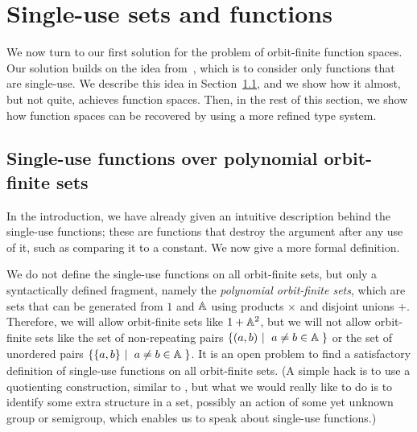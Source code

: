 \section{Single-use sets and functions}
\label{sec:single-use-sets}
We now turn to our first solution for the problem of orbit-finite function spaces.  Our solution builds on the idea from~\cite[Section 2.2]{stefanski-phd}, which is to consider only functions that are single-use. We describe this idea in Section~\ref{sec:single-use-functions-over-polynomial-orbit-finite-sets}, and we show how it almost, but not quite, achieves function spaces. Then, in the rest of this section, we show how function spaces can be recovered by using a more refined type system. 

\subsection{Single-use functions over polynomial orbit-finite sets}
\label{sec:single-use-functions-over-polynomial-orbit-finite-sets}

In the introduction, we have already given an intuitive description behind the single-use functions; these are functions that destroy the argument after any use of it, such as comparing it to a constant. We now give a more formal definition.

We do not define the single-use functions on all orbit-finite sets, but only a syntactically defined fragment, namely the \emph{polynomial orbit-finite sets}, which are sets that can be generated from $1$ and $\mathbb A$ using  
 products $\times$ and disjoint unions $+$. Therefore, we will allow orbit-finite sets like $1 + \mathbb A^2$, but we will not allow orbit-finite sets like 
the set of non-repeating pairs
$\setbuild{(a,b)}{$a \neq b \in \atoms$}$ or the set of unordered pairs $\setbuild{\set{a,b}}{$a \neq b \in \atoms$}$. It is an open problem to find a satisfactory definition of single-use functions on all orbit-finite sets. (A simple hack is to use a quotienting construction, similar to , but what we would really like to do is to identify some extra structure in a set, possibly an action of some yet unknown group or semigroup, which enables us to speak about single-use functions.)

